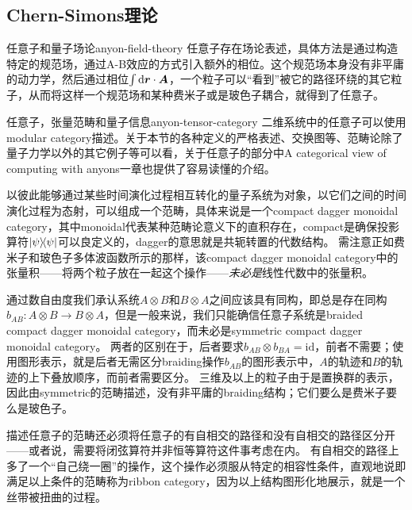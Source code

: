 \subsection{Chern-Simons理论}

\begin{back}{任意子和量子场论}{anyon-field-theory}
    任意子存在场论表述，具体方法是通过构造特定的规范场，通过A-B效应的方式引入额外的相位。这个规范场本身没有非平庸的动力学，然后通过相位$\int \dd{\vb*{r}} \cdot \vb*{A}$，一个粒子可以“看到”被它的路径环绕的其它粒子，从而将这样一个规范场和某种费米子或是玻色子耦合，就得到了任意子。
    
\end{back}



\begin{back}{任意子，张量范畴和量子信息}{anyon-tensor-category}
    二维系统中的任意子可以使用modular category描述。关于本节的各种定义的严格表述、交换图等、范畴论除了量子力学以外的其它例子等可以看\cite{beer2018categories}，关于任意子的部分\cite{new_structures}中A categorical view of computing with anyons一章也提供了容易读懂的介绍。
    
    以彼此能够通过某些时间演化过程相互转化的量子系统为对象，以它们之间的时间演化过程为态射，可以组成一个范畴，具体来说是一个compact dagger monoidal category，其中monoidal代表某种范畴论意义下的直积存在，compact是确保投影算符$\dyad{\psi}$可以良定义的，dagger的意思就是共轭转置的代数结构。
    需注意正如费米子和玻色子多体波函数所示的那样，该compact dagger monoidal category中的张量积——将两个粒子放在一起这个操作——\emph{未必是}线性代数中的张量积。

    通过数自由度我们承认系统$A \otimes B$和$B \otimes A$之间应该具有同构，即总是存在同构$b_{AB} :A \otimes B \to B \otimes A$，但是一般来说，我们只能确信任意子系统是braided compact dagger monoidal category，而未必是symmetric compact dagger monoidal category。
    两者的区别在于，后者要求$b_{AB} \otimes b_{BA} = \mathrm{id}$，前者不需要；使用图形表示，就是后者无需区分braiding操作$b_{AB}$的图形表示中，$A$的轨迹和$B$的轨迹的上下叠放顺序，而前者需要区分。
    三维及以上的粒子由于是置换群的表示，因此由symmetric的范畴描述，没有非平庸的braiding结构；它们要么是费米子要么是玻色子。

    描述任意子的范畴还必须将任意子的有自相交的路径和没有自相交的路径区分开——或者说，需要将闭弦算符并非恒等算符这件事考虑在内。
    有自相交的路径上多了一个“自己绕一圈”的操作，这个操作必须服从特定的相容性条件，直观地说即 %
    满足以上条件的范畴称为ribbon category，因为以上结构图形化地展示，就是一个丝带被扭曲的过程。


\end{back}
